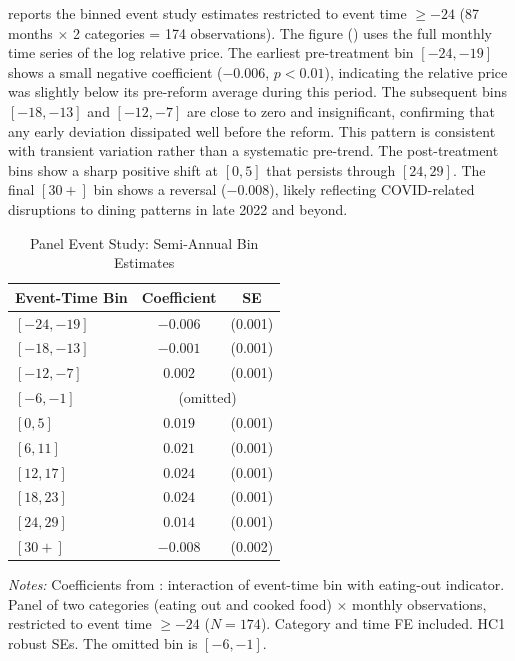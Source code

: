 \documentclass[12pt]{article}
\begin{document}
 reports the binned event study estimates restricted to event time $\geq -24$ (87 months $\times$ 2 categories = 174 observations). The figure () uses the full monthly time series of the log relative price. The earliest pre-treatment bin $[-24, -19]$ shows a small negative coefficient ($-0.006$, $p < 0.01$), indicating the relative price was slightly below its pre-reform average during this period. The subsequent bins $[-18, -13]$ and $[-12, -7]$ are close to zero and insignificant, confirming that any early deviation dissipated well before the reform. This pattern is consistent with transient variation rather than a systematic pre-trend. The post-treatment bins show a sharp positive shift at $[0, 5]$ that persists through $[24, 29]$. The final $[30+]$ bin shows a reversal ($-0.008$), likely reflecting COVID-related disruptions to dining patterns in late 2022 and beyond.

\begin{table}[H]
\centering
\caption{Panel Event Study: Semi-Annual Bin Estimates}
\begin{threeparttable}
\begin{tabular}{lcc}
\toprule
Event-Time Bin & Coefficient & SE \\
\midrule
$[-24, -19]$ & $-0.006$ & (0.001) \\
$[-18, -13]$ & $-0.001$ & (0.001) \\
$[-12, -7]$ & $0.002$ & (0.001) \\
$[-6, -1]$ & \multicolumn{2}{c}{(omitted)} \\
$[0, 5]$ & $0.019$ & (0.001) \\
$[6, 11]$ & $0.021$ & (0.001) \\
$[12, 17]$ & $0.024$ & (0.001) \\
$[18, 23]$ & $0.024$ & (0.001) \\
$[24, 29]$ & $0.014$ & (0.001) \\
$[30+]$ & $-0.008$ & (0.002) \\
\bottomrule
\end{tabular}
\begin{tablenotes}[flushleft]
\small
\item \textit{Notes:} Coefficients from : interaction of event-time bin with eating-out indicator. Panel of two categories (eating out and cooked food) $\times$ monthly observations, restricted to event time $\geq -24$ ($N = 174$). Category and time FE included. HC1 robust SEs. The omitted bin is $[-6, -1]$.
\end{tablenotes}
\end{threeparttable}
\label{tab:event_bins}
\end{table}
\end{document}
